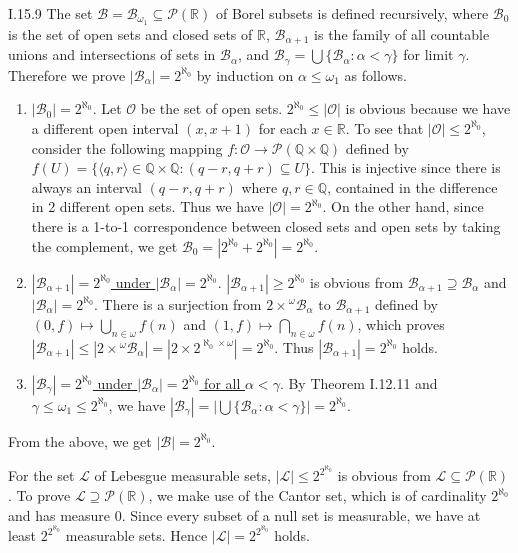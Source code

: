 \documentclass[12pt]{article}
\begin{document}
\begin{customthm}{I.15.9}
  The set $\mathcal{B}=\mathcal{B}_{\omega_1}\subseteq\mathcal{P}(\mathbb{R})$ of Borel subsets is defined recursively, where $\mathcal{B}_0$ is the set of open sets and closed sets of $\mathbb{R}$, $\mathcal{B}_{\alpha+1}$ is the family of all countable unions and intersections of sets in $\mathcal{B}_\alpha$, and $\mathcal{B}_\gamma=\bigcup\{\mathcal{B}_\alpha:\alpha<\gamma\}$ for limit $\gamma$. Therefore we prove $|\mathcal{B_\alpha}|=2^{\aleph_0}$ by induction on $\alpha\leq\omega_1$ as follows.
  \begin{enumerate}
    \item\underline{$|\mathcal{B}_0|=2^{\aleph_0}$}. Let $\mathcal{O}$ be the set of open sets. $2^{\aleph_0}\leq|\mathcal{O}|$ is obvious because we have a different open interval $(x,x+1)$ for each $x\in\mathbb{R}$. To see that $|\mathcal{O}|\leq2^{\aleph_0}$, consider the following mapping $f:\mathcal{O}\rightarrow\mathcal{P}(\mathbb{Q}\times\mathbb{Q})$ defined by $f(U)=\{\langle q,r\rangle\in\mathbb{Q}\times\mathbb{Q}:(q-r,q+r)\subseteq U\}$. This is injective since there is always an interval $(q-r,q+r)$ where $q,r\in\mathbb{Q}$, contained in the difference in 2 different open sets. Thus we have $|\mathcal{O}|=2^{\aleph_0}$. On the other hand, since there is a 1-to-1 correspondence between closed sets and open sets by taking the complement, we get $\mathcal{B}_0=|2^{\aleph_0}+2^{\aleph_0}|=2^{\aleph_0}$.
    \item\underline{$|\mathcal{B}_{\alpha+1}|=2^{\aleph_0}$ under $|\mathcal{B}_\alpha|=2^{\aleph_0}$}.  $|\mathcal{B}_{\alpha+1}|\geq2^{\aleph_0}$ is obvious from $\mathcal{B}_{\alpha+1}\supseteq\mathcal{B}_\alpha$ and $|\mathcal{B}_\alpha|=2^{\aleph_0}$. There is a surjection from $2\times{}^\omega\mathcal{B}_{\alpha}$ to $\mathcal{B}_{\alpha+1}$ defined by $(0,f)\mapsto\bigcup_{n\in\omega}f(n)$ and $(1,f)\mapsto\bigcap_{n\in\omega}f(n)$, which proves $|\mathcal{B}_{\alpha+1}|\leq|2\times{}^\omega\mathcal{B}_{\alpha}|=|2\times2^{\aleph_0\times\omega}|=2^{\aleph_0}$. Thus $|\mathcal{B}_{\alpha+1}|=2^{\aleph_0}$ holds.
    \item\underline{$|\mathcal{B}_\gamma|=2^{\aleph_0}$ under $|\mathcal{B}_\alpha|=2^{\aleph_0}$ for all $\alpha<\gamma$}. By Theorem I.12.11 and $\gamma\leq\omega_1\leq2^{\aleph_0}$, we have $|\mathcal{B}_\gamma|=|\bigcup\{\mathcal{B}_\alpha:\alpha<\gamma\}|=2^{\aleph_0}$.
  \end{enumerate}
  From the above, we get $|\mathcal{B}|=2^{\aleph_0}$.

  For the set $\mathcal{L}$ of Lebesgue measurable sets, $|\mathcal{L}|\leq2^{2^{\aleph_0}}$ is obvious from $\mathcal{L}\subseteq\mathcal{P}(\mathbb{R})$. To prove $\mathcal{L}\supseteq\mathcal{P}(\mathbb{R})$, we make use of the Cantor set, which is of cardinality $2^{\aleph_0}$ and has measure $0$. Since every subset of a null set is measurable, we have at least $2^{2^{\aleph_0}}$ measurable sets. Hence $|\mathcal{L}|=2^{2^{\aleph_0}}$ holds.
\end{customthm}
\end{document}
